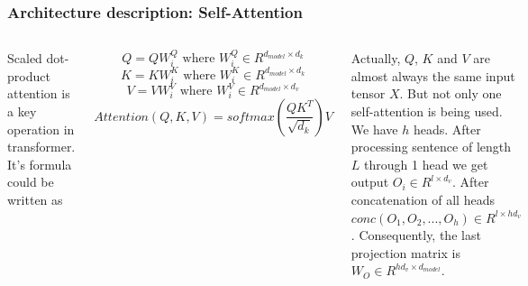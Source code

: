 \documentclass[9pt]{beamer}%
\begin{document}
\begin{frame}
	\frametitle{Architecture description: Self-Attention}
	
	\begin{columns}
		Scaled dot-product attention is a key operation in transformer. It's formula could be written as 
		
		\[ Q = Q W_i^Q \text{ where } W_i^Q \in R^{d_{model} \times d_k} \]
		\[ K = K W_i^K \text{ where } W_i^K \in R^{d_{model} \times d_k} \]
		\[ V = V W_i^V \text{ where } W_i^V \in R^{d_{model} \times d_v}  \]
		\[ Attention(Q, K, V) = softmax \left( \frac{QK^T}{\sqrt{d_k}} \right) V \]
		
		Actually, $Q$, $K$ and $V$ are almost always the same input tensor $X$. But not only one self-attention is being used. We have $h$ heads. After processing sentence of length $L$ through 1 head we get output $O_i \in R^{l \times d_v}$. After concatenation of all heads $conc(O_1, O_2, ..., O_h) \in R^{l \times hd_v}$. Consequently, the last projection matrix is $W_O \in R^{hd_v \times d_{model}}$.
		

\end{columns}
\end{frame}
\end{document}
